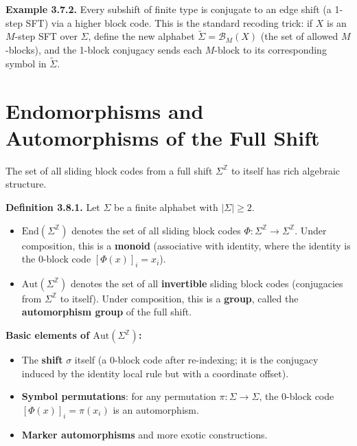 \textbf{Example 3.7.2.} Every subshift of finite type is conjugate to an edge shift (a 1-step SFT) via a higher block code. This is the standard recoding trick: if $X$ is an $M$-step SFT over $\Sigma$, define the new alphabet $\tilde{\Sigma} = \mathcal{B}_M(X)$ (the set of allowed $M$-blocks), and the 1-block conjugacy sends each $M$-block to its corresponding symbol in $\tilde{\Sigma}$.



\section{Endomorphisms and Automorphisms of the Full Shift}

The set of all sliding block codes from a full shift $\Sigma^\mathbb{Z}$ to itself has rich algebraic structure.

\textbf{Definition 3.8.1.} Let $\Sigma$ be a finite alphabet with $|\Sigma| \geq 2$.

\begin{itemize}
\item $\text{End}(\Sigma^\mathbb{Z})$ denotes the set of all sliding block codes $\Phi: \Sigma^\mathbb{Z} \to \Sigma^\mathbb{Z}$. Under composition, this is a \textbf{monoid} (associative with identity, where the identity is the 0-block code $[\Phi(x)]_i = x_i$).
\end{itemize}

\begin{itemize}
\item $\text{Aut}(\Sigma^\mathbb{Z})$ denotes the set of all \textbf{invertible} sliding block codes (conjugacies from $\Sigma^\mathbb{Z}$ to itself). Under composition, this is a \textbf{group}, called the \textbf{automorphism group} of the full shift.
\end{itemize}

\textbf{Basic elements of $\text{Aut}(\Sigma^\mathbb{Z})$:}

\begin{itemize}
\item The \textbf{shift} $\sigma$ itself (a 0-block code after re-indexing; it is the conjugacy induced by the identity local rule but with a coordinate offset).
\item \textbf{Symbol permutations}: for any permutation $\pi: \Sigma \to \Sigma$, the 0-block code $[\Phi(x)]_i = \pi(x_i)$ is an automorphism.
\item \textbf{Marker automorphisms} and more exotic constructions.
\end{itemize}

